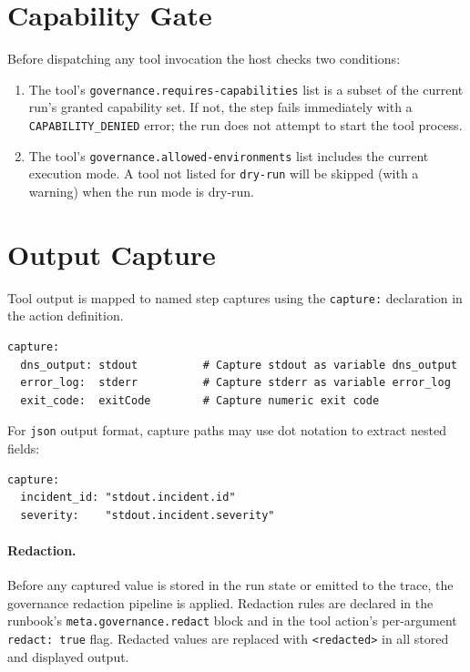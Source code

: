\section{Capability Gate}
\label{sec:tool-capability-gate}

Before dispatching any tool invocation the host checks two conditions:

\begin{enumerate}
  \item The tool's \texttt{governance.requires-capabilities} list is a subset
        of the current run's granted capability set.  If not, the step fails
        immediately with a \texttt{CAPABILITY\_DENIED} error; the run does not
        attempt to start the tool process.
  \item The tool's \texttt{governance.allowed-environments} list includes the
        current execution mode.  A tool not listed for \texttt{dry-run} will be
        skipped (with a warning) when the run mode is dry-run.
\end{enumerate}

\section{Output Capture}
\label{sec:tool-output}

Tool output is mapped to named step captures using the \texttt{capture:}
declaration in the action definition.

\begin{verbatim}
capture:
  dns_output: stdout          # Capture stdout as variable dns_output
  error_log:  stderr          # Capture stderr as variable error_log
  exit_code:  exitCode        # Capture numeric exit code
\end{verbatim}

For \texttt{json} output format, capture paths may use dot notation to extract
nested fields:

\begin{verbatim}
capture:
  incident_id: "stdout.incident.id"
  severity:    "stdout.incident.severity"
\end{verbatim}

\paragraph{Redaction.}
Before any captured value is stored in the run state or emitted to the trace,
the governance redaction pipeline is applied.  Redaction rules are declared in
the runbook's \texttt{meta.governance.redact} block and in the tool action's
per-argument \texttt{redact: true} flag.  Redacted values are replaced with
\texttt{<redacted>} in all stored and displayed output.

